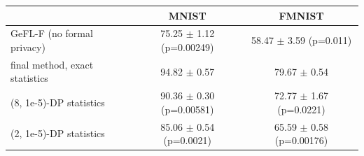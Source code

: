 \begin{tabular}{lcc}
\toprule
 & MNIST & FMNIST \\
\midrule
GeFL-F (no formal privacy) & 75.25 $\pm$ 1.12 (p=0.00249) & 58.47 $\pm$ 3.59 (p=0.011) \\
final method, exact statistics & 94.82 $\pm$ 0.57 & 79.67 $\pm$ 0.54 \\
(8, 1e-5)-DP statistics & 90.36 $\pm$ 0.30 (p=0.00581) & 72.77 $\pm$ 1.67 (p=0.0221) \\
(2, 1e-5)-DP statistics & 85.06 $\pm$ 0.54 (p=0.0021) & 65.59 $\pm$ 0.58 (p=0.00176) \\
\bottomrule
\end{tabular}

